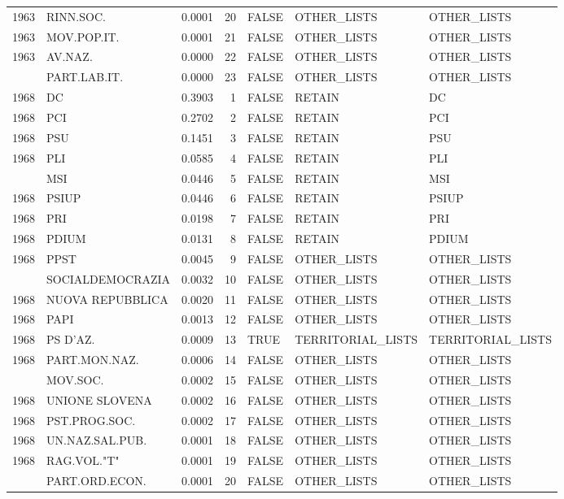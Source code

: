 \begin{longtable}[t]{rlrrlll}
1963 & RINN.SOC. & 0.0001 & 20 & FALSE & OTHER\_LISTS & OTHER\_LISTS\\
1963 & MOV.POP.IT. & 0.0001 & 21 & FALSE & OTHER\_LISTS & OTHER\_LISTS\\
1963 & AV.NAZ. & 0.0000 & 22 & FALSE & OTHER\_LISTS & OTHER\_LISTS\\
\addlinespace
1963 & PART.LAB.IT. & 0.0000 & 23 & FALSE & OTHER\_LISTS & OTHER\_LISTS\\
1968 & DC & 0.3903 & 1 & FALSE & RETAIN & DC\\
1968 & PCI & 0.2702 & 2 & FALSE & RETAIN & PCI\\
1968 & PSU & 0.1451 & 3 & FALSE & RETAIN & PSU\\
1968 & PLI & 0.0585 & 4 & FALSE & RETAIN & PLI\\
\addlinespace
1968 & MSI & 0.0446 & 5 & FALSE & RETAIN & MSI\\
1968 & PSIUP & 0.0446 & 6 & FALSE & RETAIN & PSIUP\\
1968 & PRI & 0.0198 & 7 & FALSE & RETAIN & PRI\\
1968 & PDIUM & 0.0131 & 8 & FALSE & RETAIN & PDIUM\\
1968 & PPST & 0.0045 & 9 & FALSE & OTHER\_LISTS & OTHER\_LISTS\\
\addlinespace
1968 & SOCIALDEMOCRAZIA & 0.0032 & 10 & FALSE & OTHER\_LISTS & OTHER\_LISTS\\
1968 & NUOVA REPUBBLICA & 0.0020 & 11 & FALSE & OTHER\_LISTS & OTHER\_LISTS\\
1968 & PAPI & 0.0013 & 12 & FALSE & OTHER\_LISTS & OTHER\_LISTS\\
1968 & PS D'AZ. & 0.0009 & 13 & TRUE & TERRITORIAL\_LISTS & TERRITORIAL\_LISTS\\
1968 & PART.MON.NAZ. & 0.0006 & 14 & FALSE & OTHER\_LISTS & OTHER\_LISTS\\
\addlinespace
1968 & MOV.SOC. & 0.0002 & 15 & FALSE & OTHER\_LISTS & OTHER\_LISTS\\
1968 & UNIONE SLOVENA & 0.0002 & 16 & FALSE & OTHER\_LISTS & OTHER\_LISTS\\
1968 & PST.PROG.SOC. & 0.0002 & 17 & FALSE & OTHER\_LISTS & OTHER\_LISTS\\
1968 & UN.NAZ.SAL.PUB. & 0.0001 & 18 & FALSE & OTHER\_LISTS & OTHER\_LISTS\\
1968 & RAG.VOL."T" & 0.0001 & 19 & FALSE & OTHER\_LISTS & OTHER\_LISTS\\
\addlinespace
1968 & PART.ORD.ECON. & 0.0001 & 20 & FALSE & OTHER\_LISTS & OTHER\_LISTS\\

\end{longtable}
